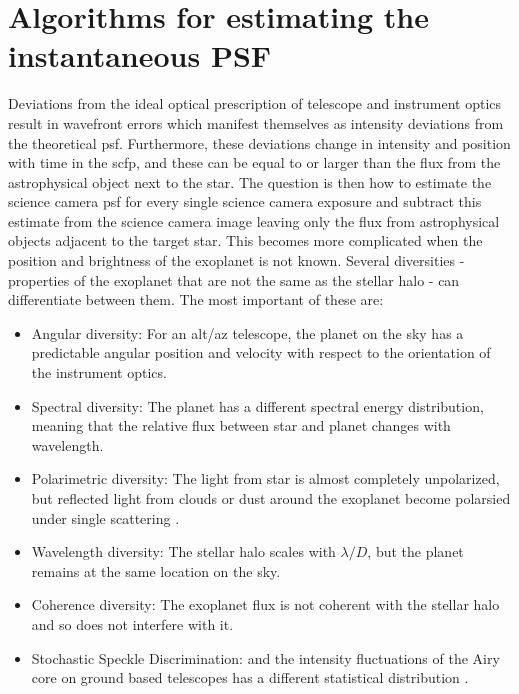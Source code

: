 \documentclass[letterpaper]{ar-1col}
\newcommand{\ld}{$\lambda/D$}
\begin{document}
\section{Algorithms for estimating the instantaneous PSF}

Deviations from the ideal optical prescription of telescope and instrument optics result in wavefront errors which manifest themselves as intensity deviations from the theoretical \ac{psf}.
%
Furthermore, these deviations change in intensity and position with time in the \ac{scfp}, and these can be equal to or larger than the flux from the astrophysical object next to the star.
%
The question is then how to estimate the science camera \ac{psf} for every single science camera exposure  and subtract this estimate from the science camera image leaving only the flux from astrophysical objects adjacent to the target star.
%
This becomes more complicated when the position and brightness of the exoplanet is not known.
%
Several diversities - properties of the exoplanet that are not the same as the stellar halo - can differentiate between them.
%
The most important of these are:

\begin{itemize}
    \item Angular diversity: For an alt/az telescope, the planet on the sky has a predictable angular position and velocity with respect to the orientation of the instrument optics.
    \item Spectral diversity: The planet has a different spectral energy distribution, meaning that the relative flux between star and planet changes with wavelength.
    \item Polarimetric diversity: The light from star is almost completely unpolarized, but reflected light from clouds or dust around the exoplanet become polarsied under single scattering \citep{Gledhill91}.
    \item Wavelength diversity: The stellar halo scales with \ld{}, but the planet remains at the same location on the sky.
    \item Coherence diversity: The exoplanet flux is not coherent with the stellar halo and so does not interfere with it.
    \item Stochastic Speckle Discrimination: and the intensity fluctuations of the Airy core on ground based telescopes has a different statistical distribution \citep{Gladysz09}.
\end{itemize}
\end{document}
